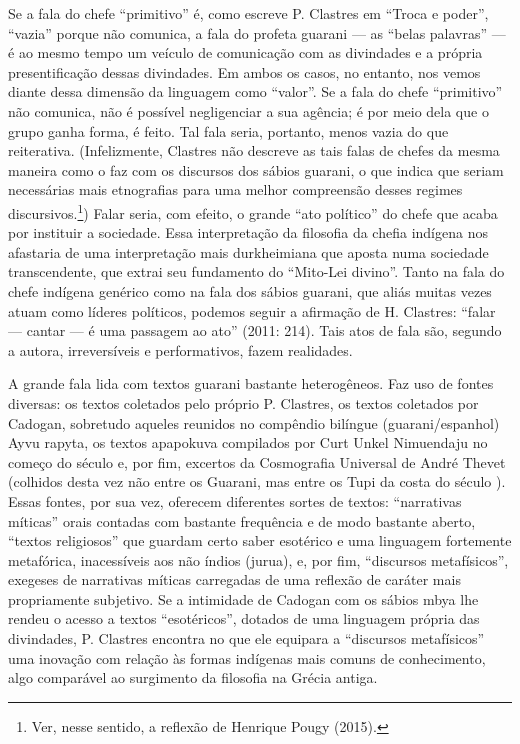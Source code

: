 Se a fala do chefe ``primitivo'' é, como escreve P. Clastres em ``Troca e
poder'', ``vazia'' porque não comunica, a fala do profeta guarani — as
``belas palavras'' — é ao mesmo tempo um veículo de comunicação com as
divindades e a própria presentificação dessas divindades. Em ambos os
casos, no entanto, nos vemos diante dessa dimensão da linguagem como
``valor''. Se a fala do chefe ``primitivo'' não comunica, não é possível
negligenciar a sua agência; é por meio dela que o grupo ganha forma, é
feito. Tal fala seria, portanto, menos vazia do que reiterativa.
(Infelizmente, Clastres não descreve as tais falas de chefes da mesma
maneira como o faz com os discursos dos sábios guarani, o que indica
que seriam necessárias mais etnografias para uma melhor compreensão
desses regimes discursivos.\footnote{Ver, nesse sentido, a reflexão de
Henrique Pougy (2015).}) Falar seria, com efeito, o grande ``ato
político'' do chefe que acaba por instituir a sociedade. Essa
interpretação da filosofia da chefia indígena nos afastaria de uma
interpretação mais durkheimiana que aposta numa sociedade
transcendente, que extrai seu fundamento do ``Mito-Lei divino''. Tanto na
fala do chefe indígena genérico como na fala dos sábios guarani, que
aliás muitas vezes atuam como líderes políticos, podemos seguir a
afirmação de H. Clastres: ``falar — cantar — é uma passagem ao ato''
(2011: 214). Tais atos de fala são, segundo a autora, irreversíveis e
performativos, fazem realidades. 

A grande fala lida com textos guarani bastante heterogêneos. Faz uso de
fontes diversas: os textos coletados pelo próprio P. Clastres, os
textos coletados por Cadogan, sobretudo aqueles reunidos no compêndio
bilíngue (guarani/espanhol) Ayvu rapyta, os textos apapokuva compilados
por Curt Unkel Nimuendaju no começo do século  e, por fim, excertos
da Cosmografia Universal de André Thevet (colhidos desta vez não entre
os Guarani, mas entre os Tupi da costa do século ). Essas fontes,
por sua vez, oferecem diferentes sortes de textos: ``narrativas míticas''
orais contadas com bastante frequência e de modo bastante aberto,
``textos religiosos'' que guardam certo saber esotérico e uma linguagem
fortemente metafórica, inacessíveis aos não índios (jurua), e, por fim,
``discursos metafísicos'', exegeses de narrativas míticas carregadas de
uma reflexão de caráter mais propriamente subjetivo. Se a intimidade de
Cadogan com os sábios mbya lhe rendeu o acesso a textos ``esotéricos'',
dotados de uma linguagem própria das divindades, P. Clastres encontra
no que ele equipara a ``discursos metafísicos'' uma inovação com relação
às formas indígenas mais comuns de conhecimento, algo comparável ao
surgimento da filosofia na Grécia antiga.

